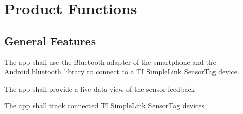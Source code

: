 \section{Product Functions}


\subsection{General Features}
  \item[F0.1] The app shall use the Bluetooth adapter of the smartphone and the Android.bluetooth library to connect to a TI SimpleLink SensorTag device.
\item[F0.2] The app shall provide a live data view of the sensor feedback
\item[F0.3] The app shall track connected TI SimpleLink SensorTag devices


